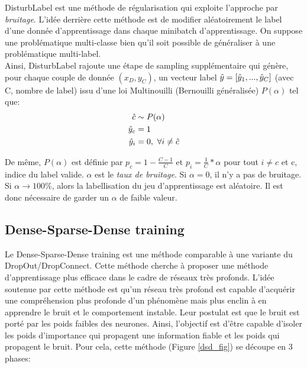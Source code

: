 \noindent DisturbLabel\cite{disturblabel} est une méthode de régularisation qui exploite l'approche par \textit{bruitage}. L'idée derrière cette méthode est de modifier aléatoirement le label d'une donnée d'apprentissage dans chaque minibatch d'apprentissage. On suppose une problématique multi-classe bien qu'il soit possible de généraliser à une problématique multi-label.\\

\noindent Ainsi, DisturbLabel rajoute une étape de sampling supplémentaire qui génère, pour chaque couple de donnée $(x_D,y_C)$, un vecteur label $\Hat{y}=[\Hat{y}_1,..., \Hat{y}_C]$ (avec C, nombre de label) issu d'une loi Multinouilli (Bernouilli généralisée) $P(\alpha)$ tel que:
\begin{align*}
    \Hat{c} &\sim P(\alpha)\\
    \Hat{y}_c &= 1\\
    \Hat{y}_i &= 0, \ \forall i \neq \Hat{c}\\
\end{align*}

\noindent De même, $P(\alpha)$ est définie par $p_c=1-\frac{C-1}{C}$ et $p_i=\frac{1}{C}*\alpha$ pour tout $i \neq c$ et c, indice du label valide. $\alpha$ est le \textit{taux de bruitage}. Si $\alpha=0$, il n'y a pas de bruitage. Si $\alpha \rightarrow 100\%$, alors la labellisation du jeu d'apprentissage est aléatoire. Il est donc nécessaire de garder un $\alpha$ de faible valeur.

\subsection{Dense-Sparse-Dense training}

Le Dense-Sparse-Dense\cite{dsd_deep} training est une méthode comparable à une variante du DropOut/DropConnect. Cette méthode cherche à proposer une méthode d'apprentissage plus efficace dans le cadre de réseaux très profonds. L'idée soutenue par cette méthode est qu'un réseau très profond est capable d'acquérir une compréhension plus profonde d'un phénomène mais plus enclin à en apprendre le bruit et le comportement instable. Leur postulat est que le bruit est porté par les poids faibles des neurones. Ainsi, l'objectif est d'être capable d'isoler les poids d'importance qui propagent une information fiable et les poids qui propagent le bruit. Pour cela, cette méthode (Figure \ref{dsd_fig}) se découpe en 3 phases:

